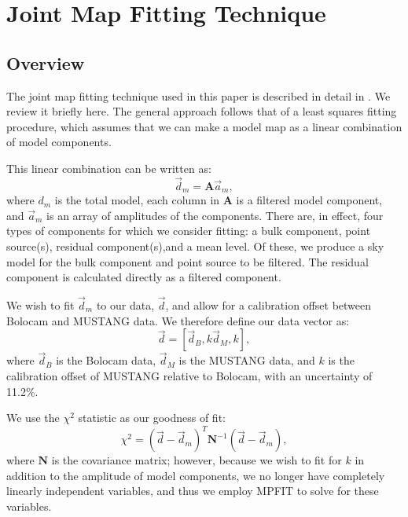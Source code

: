 \documentclass[iop,numberedappendix,apj]{emulateapj}
\begin{document}
\section{Joint Map Fitting Technique}
\label{sec:jointfitting}

\subsection{Overview}
\label{sec:jf_overview}

The joint map fitting technique used in this paper is described in detail in \citet{romero2015a}. We review
it briefly here. The general approach follows that of a least squares fitting procedure, which assumes that
we can make a model map as a linear combination of model components. 

This linear combination can be written as:
\begin{equation}
  \vec{d}_m = \mathbf{A} \vec{a}_m,
\end{equation}
where $d_m$ is the total model, each column in $\mathbf{A}$ is a filtered model component, and $\vec{a}_m$ is 
an array of amplitudes of the components. There are, in effect, four types of components for which we consider 
fitting: a bulk component, point source(s), residual component(s),and a mean level. Of these, we produce a
sky model for the bulk component and point source to be filtered. The residual component is calculated directly
as a filtered component.

We wish to fit $\vec{d}_m$ to our data, $\vec{d}$, and allow for a calibration offset between Bolocam and
MUSTANG data. We therefore define our data vector as:
\begin{equation}
  \vec{d} = [ \vec{d}_{B}, k \vec{d}_{M}, k ] ,
\end{equation}
where $\vec{d}_{B}$ is the Bolocam data, $\vec{d}_{M}$ is the MUSTANG data, and $k$ is the calibration offset of
MUSTANG relative to Bolocam, with an uncertainty of 11.2\%.

We use the $\chi^2$ statistic as our goodness of fit:
\begin{equation}
  \chi^2 = (\overrightarrow{d} - \overrightarrow{d}_m)^T \mathbf{N}^{-1} (\overrightarrow{d} - \overrightarrow{d}_m),
\end{equation}
where $\mathbf{N}$ is the covariance matrix; however, because we wish to fit for $k$ in addition to the 
amplitude of model components, we no longer have
completely linearly independent variables, and thus we employ MPFIT \citep{markwardt2009} to solve for these
variables.
\end{document}
